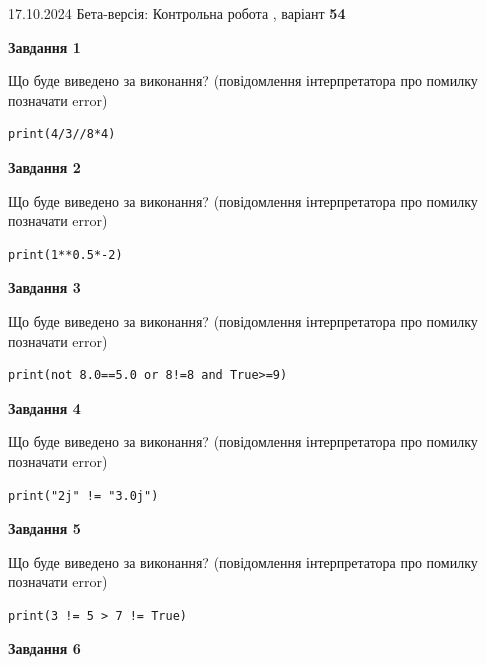 \documentclass[12pt, ukrainian]{article}
\begin{document}
{\Large{17.10.2024 Бета-версія: Контрольна робота , варіант  \No \textbf { 54 }\par}}
{
\begin {large}
{\begin {center}\textbf{Завдання 1}\end {center}}

Що буде виведено за виконання? (повідомлення інтерпретатора про помилку позначати error)\par
\begin{verbatim}
print(4/3//8*4)
\end{verbatim}

{\begin {center}\textbf{Завдання 2}\end {center}}

Що буде виведено за виконання? (повідомлення інтерпретатора про помилку позначати error)\par
\begin{verbatim}
print(1**0.5*-2)
\end{verbatim}

{\begin {center}\textbf{Завдання 3}\end {center}}

Що буде виведено за виконання? (повідомлення інтерпретатора про помилку позначати error)\par
\begin{verbatim}
print(not 8.0==5.0 or 8!=8 and True>=9)
\end{verbatim}

{\begin {center}\textbf{Завдання 4}\end {center}}

Що буде виведено за виконання? (повідомлення інтерпретатора про помилку позначати error)\par
\begin{verbatim}
print("2j" != "3.0j")
\end{verbatim}

{\begin {center}\textbf{Завдання 5}\end {center}}

Що буде виведено за виконання? (повідомлення інтерпретатора про помилку позначати error)\par
\begin{verbatim}
print(3 != 5 > 7 != True)
\end{verbatim}

{\begin {center}\textbf{Завдання 6}\end {center}}


\end{large}}
\end{document}
